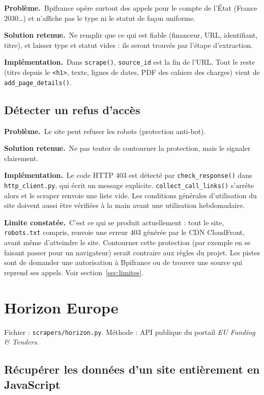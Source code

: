\documentclass[11pt,a4paper]{article}
\newcommand{\pb}{\par\medskip\noindent\textbf{\textcolor{pbcolor}{Problème.}}\ }
\newcommand{\sol}{\par\medskip\noindent\textbf{\textcolor{solcolor}{Solution retenue.}}\ }
\newcommand{\impl}{\par\medskip\noindent\textbf{\textcolor{implcolor}{Implémentation.}}\ }
\newcommand{\limite}{\par\medskip\noindent\textbf{Limite constatée.}\ }
\newcommand{\code}[1]{\texttt{#1}}
\begin{document}
\pb Bpifrance opère surtout des appels pour le compte de l'État (France 2030\dots) et
n'affiche pas le type ni le statut de façon uniforme.

\sol Ne remplir que ce qui est fiable (financeur, URL, identifiant, titre), et laisser
type et statut vides : ils seront trouvés par l'étape d'extraction.

\impl Dans \code{scrape()}, \code{source\_id} est la fin de l'URL. Tout le reste (titre
depuis le \code{<h1>}, texte, lignes de dates, PDF des cahiers des charges) vient de
\code{add\_page\_details()}.

\subsection{Détecter un refus d'accès}

\pb Le site peut refuser les robots (protection anti-bot).

\sol Ne pas tenter de contourner la protection, mais le signaler clairement.

\impl Le code HTTP 403 est détecté par \code{check\_response()} dans \code{http\_client.py},
qui écrit un message explicite. \code{collect\_call\_links()} s'arrête alors et le scraper
renvoie une liste vide. Les conditions générales d'utilisation du site doivent aussi être
vérifiées à la main avant une utilisation hebdomadaire.

\limite C'est ce qui se produit actuellement : tout le site, \code{robots.txt} compris,
renvoie une erreur 403 générée par le CDN CloudFront, avant même d'atteindre le site.
Contourner cette protection (par exemple en se faisant passer pour un navigateur) serait
contraire aux règles du projet. Les pistes sont de demander une autorisation à Bpifrance
ou de trouver une source qui reprend ses appels. Voir section~\ref{sec:limites}.

\section{Horizon Europe}
\label{sec:horizon}

Fichier : \code{scrapers/horizon.py}. Méthode : API publique du portail
\emph{EU Funding \& Tenders}.

\subsection{Récupérer les données d'un site entièrement en JavaScript}
\end{document}
